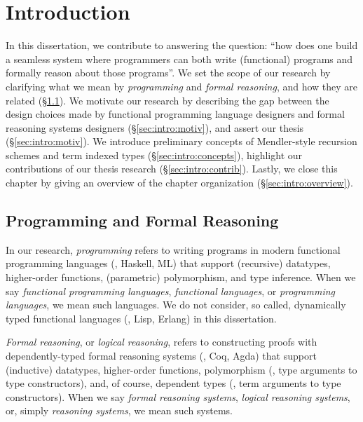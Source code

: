 \chapter{Introduction}\label{ch:intro}

In this dissertation, we contribute to answering the question:
``how does one build a seamless system where programmers can both
write (functional) programs and formally reason about those programs''.
We set the scope of our research by clarifying what we mean by
\emph{programming} and \emph{formal reasoning}, and how they are related
(\S\ref{sec:intro:scope}). We motivate our research by describing the gap
between the design choices made by functional programming language designers and
formal reasoning systems designers (\S\ref{sec:intro:motiv}), and assert
our thesis (\S\ref{sec:intro:motiv}). We introduce preliminary concepts
of Mendler-style recursion schemes and term indexed types
(\S\ref{sec:intro:concepts}), highlight our contributions of
our thesis research (\S\ref{sec:intro:contrib}). Lastly, we close
this chapter by %
giving an overview of the chapter organization (\S\ref{sec:intro:overview}).

\section{Programming and Formal Reasoning}\label{sec:intro:scope}

In our research, \emph{programming} refers to writing programs in
modern functional programming languages (\eg, Haskell, ML) that support
(recursive) datatypes, higher-order functions, (parametric) polymorphism,
and type inference. When we say \emph{functional programming languages},
\emph{functional languages}, or \emph{programming languages},
we mean such languages. We do not consider,
so called, dynamically typed functional languages (\eg, Lisp, Erlang)
in this dissertation.

\emph{Formal reasoning}, or \emph{logical reasoning},
refers to constructing proofs with dependently-typed formal reasoning systems
(\eg, Coq, Agda) that support (inductive) datatypes, higher-order functions,
polymorphism (\ie, type arguments to type constructors), and, of course,
dependent types (\ie, term arguments to type constructors). When we say
\emph{formal reasoning systems}, \emph{logical reasoning systems},
or, simply \emph{reasoning systems}, we mean such systems.

